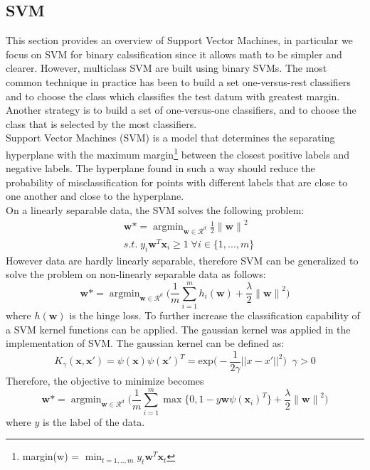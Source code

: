 \documentclass{article}
\DeclareMathOperator*{\argmin}{argmin}
\begin{document}
\subsection{SVM}
This section provides an overview of Support Vector Machines, in particular we focus on SVM for binary calssification since it allows math to be simpler and clearer. However, multiclass SVM are built using binary SVMs.  The most common technique in practice has been to build  a set one-versus-rest classifiers and to choose the class which classifies the test datum with greatest margin. Another strategy is to build a set of one-versus-one classifiers, and to choose the class that is selected by the most classifiers. \cite{svm}
\\
Support Vector Machines (SVM) is a model that determines the separating hyperplane with the maximum margin\footnote{margin(w) = $\min_{t=1,..,m} y_t\textbf{w}^T\textbf{x}_t$} between the closest positive labels and negative labels. The hyperplane found in such a way should reduce the probability of misclassification for points with different labels that are close to one another and close to the hyperplane. \\
On a linearly separable data, the SVM solves the following problem:
\begin{equation}
\begin{split}
   &   \textbf{w} \mbox{*} = \argmin_{\textbf{w} \in \mathcal{R}^d} \frac{1}{2} {\lVert \textbf{w} \rVert}^2 \\
   & s.t.\; y_i\textbf{w}^{T}\textbf{x}_i \geq 1 \; \forall i \in \{1, ...,m\} 
\end{split}
\end{equation}
However data are hardly linearly separable, therefore SVM can be generalized to solve the problem on non-linearly separable data as follows:
\begin{equation}
      \textbf{w} \mbox{*} = \argmin_{\textbf{w} \in \mathcal{R}^d} \bigg( \frac{1}{m}\sum_{i=1}^m h_i(\textbf{w}) + \frac{\lambda}{2} {\lVert \textbf{w} \rVert}^2 \bigg)
\end{equation}
where $h(\textbf{w})$ is the hinge loss.
To further increase the classification capability of a SVM kernel functions can be applied. The gaussian kernel was applied in the implementation of SVM.
The gaussian kernel can be defined as:
\begin{equation}
K_{\gamma}(\textbf{x},\textbf{x}') = \psi(\textbf{x}) \psi(\textbf{x}')^T  = \text{exp} \bigg( - \frac{1}{2 \gamma} ||x - x' ||^2 \bigg) \;\; \gamma > 0
\end{equation}
Therefore, the objective to minimize becomes
\begin{equation}
      \textbf{w} \mbox{*} = \argmin_{\textbf{w} \in \mathcal{R}^d} \bigg( \frac{1}{m}\sum_{i=1}^m \max\{0,1-y\textbf{w} \psi(\textbf{x}_i)^T\} + \frac{\lambda}{2} {\lVert \textbf{w} \rVert}^2 \bigg)
\end{equation}
where $y$ is the label of the data.
\end{document}
